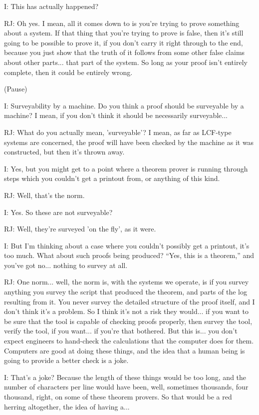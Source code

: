 \documentclass[10pt,titlepage]{book}
\begin{document}
I: This has actually happened?

RJ: Oh yes.
I mean, all it comes down to is you're trying to prove something about a system.
If that thing that you're trying to prove is false, then it's still going to be possible to prove it, if you don't carry it right through to the end, because you just show that the truth of it follows from some other false claims about other parts... that part of the system.
So long as your proof isn't entirely complete, then it could be entirely wrong.

(Pause)


I: Surveyability by a machine.
Do you think a proof should be surveyable by a machine?
I mean, if you don't think it should be necessarily surveyable...

RJ: What do you actually mean, 'surveyable'?
I mean, as far as LCF-type systems are concerned, the proof will have been checked by the machine as it was constructed, but then it's thrown away.

I: Yes, but you might get to a point where a theorem prover is running through steps which you couldn't get a printout from, or anything of this kind.

RJ: Well, that's the norm.

I: Yes.
So these are not surveyable?

RJ: Well, they're surveyed 'on the fly', as it were.

I: But I'm thinking about a case where you couldn't possibly get a printout, it's too much.
What about such proofs being produced?
``Yes, this is a theorem,'' and you've got no... nothing to survey at all.

RJ: One norm... well, the norm is, with the systems we operate, is if you survey anything you survey the script that produced the theorem, and parts of the log resulting from it.
You never survey the detailed structure of the proof itself, and I don't think it's a problem.
So I think it's not a risk they would... if you want to be sure that the tool is capable of checking proofs properly, then survey the tool, verify the tool, if you want... if you're that bothered.
But this is... you don't expect engineers to hand-check the calculations that the computer does for them.
Computers are good at doing these things, and the idea that a human being is going to provide a better check is a joke.

I: That's a joke?
Because the length of these things would be too long, and the number of characters per line would have been, well, sometimes thousands,  four thousand, right, on some of these theorem provers.
So that would be a red herring altogether, the idea of having a...
\end{document}
